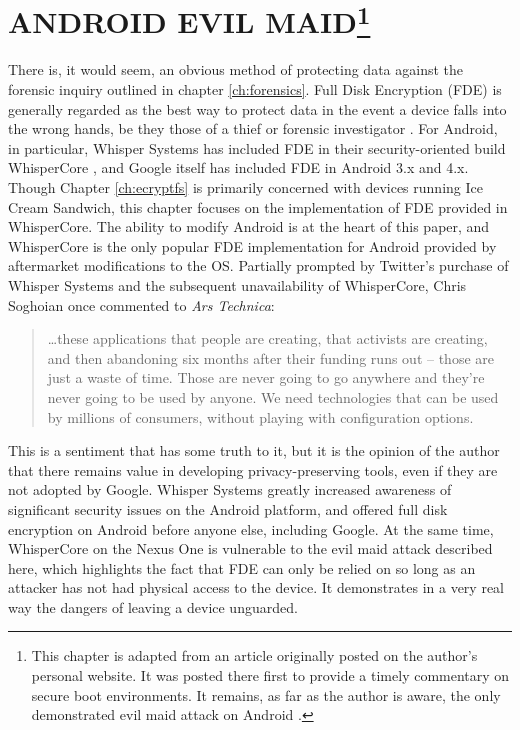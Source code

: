 \chapter[ANDROID EVIL MAID]{ANDROID EVIL MAID\protect\footnote{This chapter is adapted from an article originally posted on the author's personal
website. It was posted there first to provide a timely commentary on secure boot environments. It remains, as far as the author is
aware, the only demonstrated evil maid attack on Android \protect\cite{androidevilmaid}.}}
\label{ch:fde}

There is, it would seem, an obvious method of protecting data against the forensic inquiry outlined in chapter \ref{ch:forensics}.
Full Disk Encryption (FDE) is generally regarded as the best way to protect data in the event a device falls into the wrong hands,
be they those of a thief or forensic investigator \cite{fdeworks}.  For Android, in particular, Whisper Systems has included FDE in their
security-oriented build WhisperCore \cite{whispercore}, and Google itself has included FDE in Android 3.x and 4.x. Though Chapter
\ref{ch:ecryptfs} is primarily concerned with devices running Ice Cream Sandwich, this chapter focuses on the implementation of FDE
provided in WhisperCore.  The ability to modify Android is at the heart of this paper, and WhisperCore is the only popular FDE
implementation for Android provided by aftermarket modifications to the OS.  Partially prompted by Twitter's purchase of Whisper
Systems and the subsequent unavailability of WhisperCore, Chris Soghoian once commented to \emph{Ars Technica}: \begin{quote} \ldots these
applications that people are creating, that activists are creating, and then abandoning six months after their funding runs out --
those are just a waste of time. Those are never going to go anywhere and they're never going to be used by anyone. We need
technologies that can be used by millions of consumers, without playing with configuration options. \cite{arstechnica} \end{quote}
This is a sentiment that has some truth to it, but it is the opinion of the author that there remains value in developing
privacy-preserving tools, even if they are not adopted by Google.  Whisper Systems greatly increased awareness of significant
security issues on the Android platform, and offered full disk encryption on Android before anyone else, including Google.  At the
same time, WhisperCore on the Nexus One is vulnerable to the evil maid attack described here, which highlights the fact that FDE can
only be relied on so long as an attacker has not had physical access to the device. It demonstrates in a very real way the dangers
of leaving a device unguarded. 

